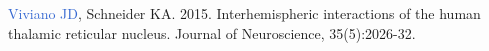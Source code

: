 \documentclass[a4paper,11pt,oneside]{book}
\newcommand\paper[1]{
    #1\\
    \vspace{3.5mm}
}
\begin{document}
\begin{flushleft}
\paper{\textcolor{highlight}{Viviano JD}, Schneider KA. 2015. Interhemispheric interactions of the human thalamic reticular nucleus. Journal of Neuroscience, 35(5):2026-32.}









\end{flushleft}
\end{document}
